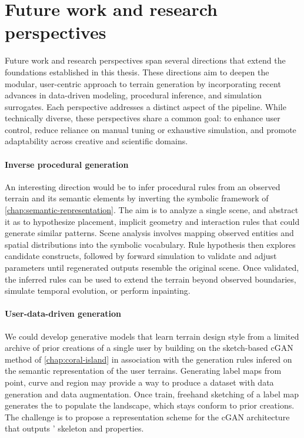 \section*{Future work and research perspectives}

Future work and research perspectives span several directions that extend the foundations established in this thesis. These directions aim to deepen the modular, user-centric approach to terrain generation by incorporating recent advances in data-driven modeling, procedural inference, and simulation surrogates. Each perspective addresses a distinct aspect of the pipeline. While technically diverse, these perspectives share a common goal: to enhance user control, reduce reliance on manual tuning or exhaustive simulation, and promote adaptability across creative and scientific domains.



\paragraph{Inverse procedural generation} An interesting direction would be to infer procedural rules from an observed terrain and its semantic elements by inverting the symbolic framework of \cref{chap:semantic-representation}. The aim is to analyze a single scene, and abstract it as  to hypothesize placement, implicit geometry and interaction rules that could generate similar patterns. Scene analysis involves mapping observed entities and spatial distributions into the symbolic vocabulary. Rule hypothesis then explores candidate constructs, followed by forward simulation to validate and adjust parameters until regenerated outputs resemble the original scene. Once validated, the inferred rules can be used to extend the terrain beyond observed boundaries, simulate temporal evolution, or perform inpainting.

\paragraph{User-data-driven generation} We could develop generative models that learn terrain design style from a limited archive of prior creations of a single user by building on the sketch-based cGAN method of \cref{chap:coral-island} in association with the generation rules infered on the semantic representation of the user terrains. Generating label maps from point, curve and region  may provide a way to produce a dataset with data generation and data augmentation. Once train, freehand sketching of a label map generates the  to populate the landscape, which stays conform to prior creations. The challenge is to propose a representation scheme for the cGAN architecture that outputs ' skeleton and properties.

